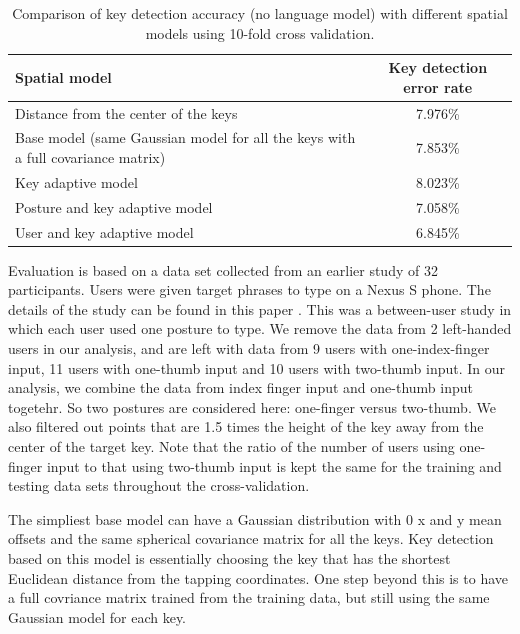 \documentclass{sigchi}
\newcommand\tabhead[1]{\small\textbf{#1}}
\begin{document}
\begin{table} [tb]
  \centering
  \begin{tabular}{|l|c|}
    \hline
    \tabhead{Spatial model} &
    \multicolumn{1}{|p{0.2\columnwidth}|}{\centering\tabhead{Key detection
    error rate}} \\
    \hline
    Distance from the center of the keys & 7.976\% \\
    \hline
    \multicolumn{1}{|p{0.7\columnwidth}|}{Base model (same Gaussian model for
    all the keys with a full covariance matrix)} & 7.853\% \\
    \hline
    Key adaptive model  & 8.023\% \\
    \hline
    Posture and key adaptive model & 7.058\% \\
    \hline
    User and key adaptive model  & 6.845\% \\
    \hline
  \end{tabular}
  \caption{Comparison of key detection accuracy (no language model) with
  different spatial models using 10-fold cross validation.}
  \label{tab:comparison}
\end{table}

Evaluation is based on a data set collected from an earlier study of 32
participants. Users were given target phrases to type on a Nexus S phone. The
details of the study can be found in this paper \cite{Azenkot:2012}. This was a between-user
study in which each user used one posture to type.
We remove the data from 2 left-handed users in our analysis, and are left with
data from 9 users with one-index-finger input, 11 users with one-thumb input and
10 users with two-thumb input.  In our analysis, we combine the data from index finger input
and one-thumb input togetehr. So two postures are considered here: one-finger versus two-thumb. We also filtered out points that are 1.5 times
the height of the key away from the center of the target key. Note that the ratio
of the number of users using one-finger input to that using two-thumb input is kept the same
for the training and testing data sets throughout the cross-validation.

The simpliest base model can have a Gaussian distribution with 0 x and y
mean offsets and the same spherical covariance matrix for all the keys. Key
detection based on this model is essentially choosing the key that has the shortest Euclidean distance from the tapping coordinates. 
One step beyond this is to have a full covriance matrix trained from the
training data, but still using the same Gaussian model for each key.
\end{document}
